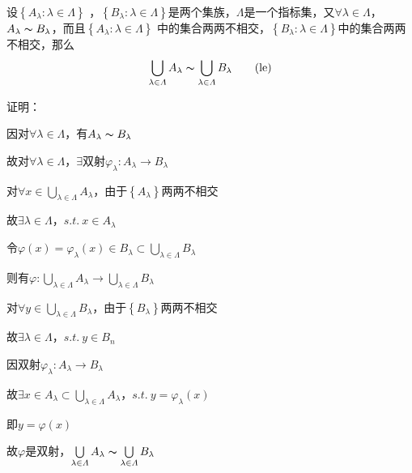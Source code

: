 \begin{la}
设$\left\{A_{\lambda } : \lambda \in \varLambda \right\}$ ，$\left\{B_{\lambda } : \lambda \in \varLambda \right\}$是两个集族，$\varLambda $是一个指标集，又$\forall \lambda  \in \varLambda $，$A_{\lambda } \thicksim B_{\lambda}$，而且$\left\{A_{\lambda } : \lambda \in \varLambda \right\}$ 中的集合两两不相交，$\left\{B_{\lambda } : \lambda \in \varLambda \right\}$中的集合两两不相交，那么
\begin{equation}
 \bigcup \limits_{\lambda \in \varLambda }A_{\lambda}\thicksim \bigcup \limits_{\lambda \in \varLambda }B_{\lambda}   \tag{le} \label{Th2}
\end{equation}
\end{la} 
\noindent 证明：
\par 因对$\forall \lambda \in \varLambda $，有$A_{\lambda } \thicksim B_{\lambda}$
\par 故对$\forall \lambda \in \varLambda $，$\exists$双射$\varphi _{\lambda } : A_{\lambda }\to B_{\lambda }$
\par 对$\forall x \in \bigcup \limits_{\lambda \in \varLambda }A_{\lambda}$，由于$\left\{A_{\lambda } \right\}$两两不相交
\par 故$\exists \lambda \in \varLambda $，$s.t. \ x \in A_{\lambda }$
\par 令$\varphi (x) = \varphi _{\lambda }(x) \in B_{\lambda }\subset \bigcup \limits_{\lambda \in \varLambda }B_{\lambda}$
\par 则有$\varphi : \bigcup \limits_{\lambda \in \varLambda }A_{\lambda}\to \bigcup \limits_{\lambda \in \varLambda }B_{\lambda}$
\par 对$\forall y \in \bigcup \limits_{\lambda \in \varLambda }B_{\lambda}$，由于$\left\{B_{\lambda }\right\} $两两不相交
\par 故$\exists \lambda \in \varLambda $，$s.t. \ y \in B_{n}$
\par 因双射$\varphi _{\lambda } : A_{\lambda }\to B_{\lambda }$
\par 故$\exists x \in A_{\lambda }\subset \bigcup \limits_{\lambda \in \varLambda }A_{\lambda}$，$s.t. \ y = \varphi _{\lambda }(x)$
\par 即$y =\varphi (x)$
\par 故$\varphi $是双射，$\bigcup \limits_{\lambda \in \varLambda }A_{\lambda}\thicksim \bigcup \limits_{\lambda \in \varLambda }B_{\lambda}$

